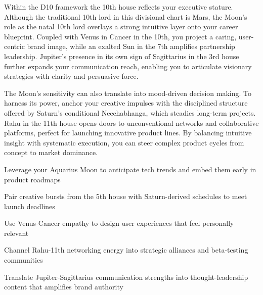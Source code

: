 {\fontsize{9}{13}\selectfont Within the D10 framework the 10th house reflects your executive stature. Although the traditional 10th lord in this divisional chart is Mars, the Moon's role as the natal 10th lord overlays a strong intuitive layer onto your career blueprint. Coupled with Venus in Cancer in the 10th, you project a caring, user-centric brand image, while an exalted Sun in the 7th amplifies partnership leadership. Jupiter's presence in its own sign of Sagittarius in the 3rd house further expands your communication reach, enabling you to articulate visionary strategies with clarity and persuasive force.}\par\vspace{1.8mm}

{\fontsize{9}{13}\selectfont The Moon's sensitivity can also translate into mood-driven decision making. To harness its power, anchor your creative impulses with the disciplined structure offered by Saturn's conditional Neechabhanga, which steadies long-term projects. Rahu in the 11th house opens doors to unconventional networks and collaborative platforms, perfect for launching innovative product lines. By balancing intuitive insight with systematic execution, you can steer complex product cycles from concept to market dominance.}\par\vspace{1.8mm}

\begin{diamondlist}
  \item {\fontsize{8.5}{12}\selectfont Leverage your Aquarius Moon to anticipate tech trends and embed them early in product roadmaps}
  \item {\fontsize{8.5}{12}\selectfont Pair creative bursts from the 5th house with Saturn-derived schedules to meet launch deadlines}
  \item {\fontsize{8.5}{12}\selectfont Use Venus-Cancer empathy to design user experiences that feel personally relevant}
  \item {\fontsize{8.5}{12}\selectfont Channel Rahu-11th networking energy into strategic alliances and beta-testing communities}
  \item {\fontsize{8.5}{12}\selectfont Translate Jupiter-Sagittarius communication strengths into thought-leadership content that amplifies brand authority}
\end{diamondlist}


